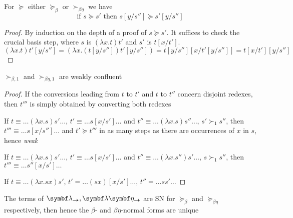 \documentclass[11pt]{article}
\begin{document}
\begin{lemma}
For \(\succeq\) either \(\succeq_\beta\) or \(\succ_{\beta\eta}\) we have
\begin{equation*}
\text{if } s\succeq s' \text{ then } s[y/s'']\succeq s'[y/s'']
\end{equation*}
\end{lemma}
\begin{proof}
By induction on the depth of a proof of \(s\succeq s'\). It suffices to check
the crucial basis step, where \(s\) is \((\lambda x.t)t'\) and \(s'\) is \(t[x/t']\).
\begin{equation*}
(\lambda x.t)t'[y/s'']=(\lambda x.(t[y/s''])t'[y/s''])=
t[y/s''][x/t'[y/s'']]=t[x/t'][y/s'']
\end{equation*}
\end{proof}

\begin{proposition}[]
\(\succ_{\beta,1}\) and \(\succ_{\beta\eta,1}\) are weakly confluent
\end{proposition}
\begin{proof}
If the conversions leading from \(t\) to \(t'\) and \(t\) to \(t''\) concern disjoint
redexes, then \(t'''\) is simply obtained by converting both redexes

If \(t\equiv\dots(\lambda x.s)s'\dots\), \(t'\equiv\dots s[x/s']\dots\) and
\(t''\equiv\dots(\lambda x.s)s''\dots\), \(s'\succ_1 s''\), then \(t'''\equiv\dots
   s[x/s'']\dots\) and \(t'\succeq t'''\)  
in as many steps as there are occurrences of \(x\) in \(s\), hence \emph{weak}

If \(t\equiv\dots(\lambda x.s)s'\dots\), \(t'\equiv\dots s[x/s']\dots\) and
\(t''\equiv\dots(\lambda x.s'')s'\dots\), \(s\succ_1 s''\), then \(t'''\equiv\dots
   s''[x/s']\dots\)

If \(t\equiv\dots(\lambda x.sx)s'\), \(t'=\dots (sx)[x/s']\dots\),
\(t''\equal\dots ss'\dots\)
\end{proof}

\begin{theorem}[]
The terms of \(\blambda_{\bto},\blambda\boldeta_{\bto}\) are SN for \(\succeq_\beta\) and
\(\succeq_{\beta\eta}\) respectively, then hence the \(\beta\)- and
\(\beta \eta\)-normal forms are unique
\end{theorem}
\end{document}
